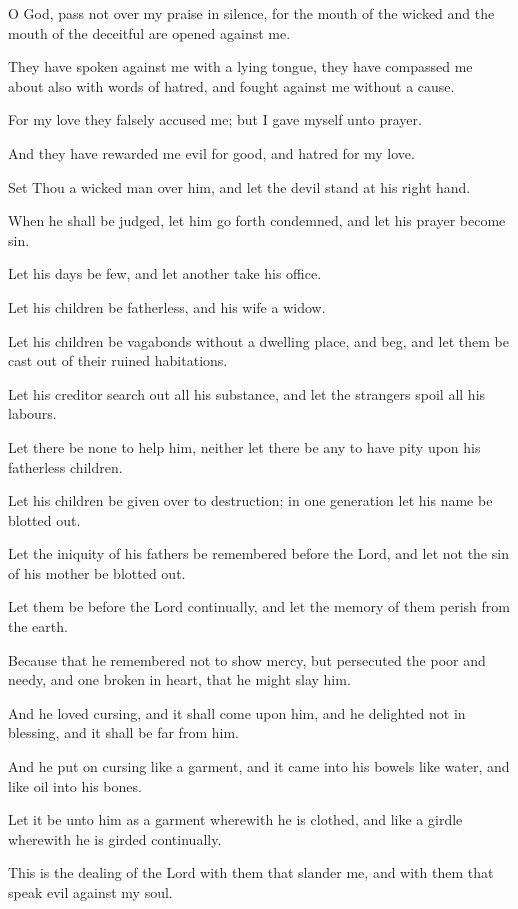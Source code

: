 O God, pass not over my praise in silence, for the mouth of the wicked and the mouth of the deceitful are opened against me.

They have spoken against me with a lying tongue, they have compassed me about also with words of hatred, and fought against me without a cause.

For my love they falsely accused me; but I gave myself unto prayer.

And they have rewarded me evil for good, and hatred for my love.

Set Thou a wicked man over him, and let the devil stand at his right hand.

When he shall be judged, let him go forth condemned, and let his prayer become sin.

Let his days be few, and let another take his office.

Let his children be fatherless, and his wife a widow.

Let his children be vagabonds without a dwelling place, and beg, and let them be cast out of their ruined habitations.

Let his creditor search out all his substance, and let the strangers spoil all his labours.

Let there be none to help him, neither let there be any to have pity upon his fatherless children.

Let his children be given over to destruction; in one generation let his name be blotted out.

Let the iniquity of his fathers be remembered before the Lord, and let not the sin of his mother be blotted out.

Let them be before the Lord continually, and let the memory of them perish from the earth.

Because that he remembered not to show mercy, but persecuted the poor and needy, and one broken in heart, that he might slay him.

And he loved cursing, and it shall come upon him, and he delighted not in blessing, and it shall be far from him.

And he put on cursing like a garment, and it came into his bowels like water, and like oil into his bones.

Let it be unto him as a garment wherewith he is clothed, and like a girdle wherewith he is girded continually.

This is the dealing of the Lord with them that slander me, and with them that speak evil against my soul.


